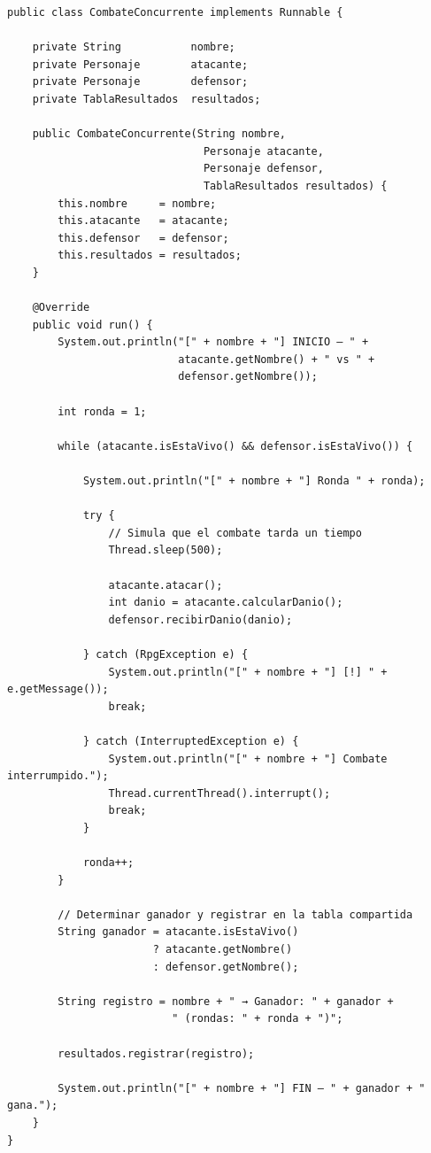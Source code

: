 \documentclass[11pt,letterpaper]{article}
\begin{document}
\begin{lstlisting}[style=JavaStyle]
public class CombateConcurrente implements Runnable {

    private String           nombre;
    private Personaje        atacante;
    private Personaje        defensor;
    private TablaResultados  resultados;

    public CombateConcurrente(String nombre,
                               Personaje atacante,
                               Personaje defensor,
                               TablaResultados resultados) {
        this.nombre     = nombre;
        this.atacante   = atacante;
        this.defensor   = defensor;
        this.resultados = resultados;
    }

    @Override
    public void run() {
        System.out.println("[" + nombre + "] INICIO — " +
                           atacante.getNombre() + " vs " +
                           defensor.getNombre());

        int ronda = 1;

        while (atacante.isEstaVivo() && defensor.isEstaVivo()) {

            System.out.println("[" + nombre + "] Ronda " + ronda);

            try {
                // Simula que el combate tarda un tiempo
                Thread.sleep(500);

                atacante.atacar();
                int danio = atacante.calcularDanio();
                defensor.recibirDanio(danio);

            } catch (RpgException e) {
                System.out.println("[" + nombre + "] [!] " + e.getMessage());
                break;

            } catch (InterruptedException e) {
                System.out.println("[" + nombre + "] Combate interrumpido.");
                Thread.currentThread().interrupt();
                break;
            }

            ronda++;
        }

        // Determinar ganador y registrar en la tabla compartida
        String ganador = atacante.isEstaVivo()
                       ? atacante.getNombre()
                       : defensor.getNombre();

        String registro = nombre + " → Ganador: " + ganador +
                          " (rondas: " + ronda + ")";

        resultados.registrar(registro);

        System.out.println("[" + nombre + "] FIN — " + ganador + " gana.");
    }
}
\end{lstlisting}
\end{document}
